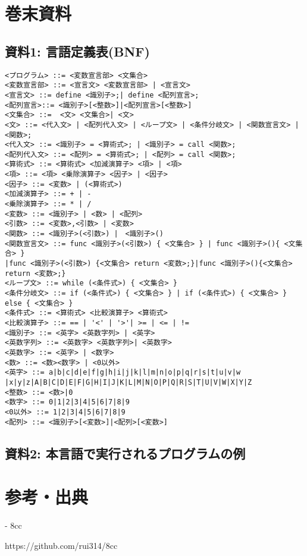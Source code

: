 \documentclass[11pt,a4j]{jarticle}
\begin{document}
\section{巻末資料}

\subsection{資料1: 言語定義表(BNF)}

{\baselineskip 2mm
\begin{verbatim}
<プログラム> ::= <変数宣言部> <文集合>
<変数宣言部> ::= <宣言文> <変数宣言部> | <宣言文>
<宣言文> ::= define <識別子>;| define <配列宣言>;
<配列宣言>::= <識別子>[<整数>]|<配列宣言>[<整数>]
<文集合> ::=  <文> <文集合>| <文>
<文> ::= <代入文> | <配列代入文> | <ループ文> | <条件分岐文> | <関数宣言文> | <関数>;
<代入文> ::= <識別子> = <算術式>; | <識別子> = call <関数>; 
<配列代入文> ::= <配列> = <算術式>; | <配列> = call <関数>;
<算術式> ::= <算術式> <加減演算子> <項> | <項>
<項> ::= <項> <乗除演算子> <因子> | <因子>
<因子> ::= <変数> | (<算術式>)
<加減演算子> ::= + | -
<乗除演算子> ::= * | /
<変数> ::= <識別子> | <数> | <配列>
<引数> ::= <変数>,<引数> | <変数>
<関数> ::= <識別子>(<引数>) |　<識別子>()
<関数宣言文> ::= func <識別子>(<引数>) { <文集合> } | func <識別子>(){ <文集合> }
|func <識別子>(<引数>) {<文集合> return <変数>;}|func <識別子>(){<文集合> return <変数>;}
<ループ文> ::= while (<条件式>) { <文集合> }
<条件分岐文> ::= if (<条件式>) { <文集合> } | if (<条件式>) { <文集合> } else { <文集合> }
<条件式> ::= <算術式> <比較演算子> <算術式>
<比較演算子> ::= == | '<' | '>'| >= | <= | !=
<識別子> ::= <英字> <英数字列> | <英字>
<英数字列> ::= <英数字> <英数字列>| <英数字>
<英数字> ::= <英字> | <数字>
<数> ::= <数><数字> | <0以外>
<英字> ::= a|b|c|d|e|f|g|h|i|j|k|l|m|n|o|p|q|r|s|t|u|v|w
|x|y|z|A|B|C|D|E|F|G|H|I|J|K|L|M|N|O|P|Q|R|S|T|U|V|W|X|Y|Z
<整数> ::= <数>|0
<数字> ::= 0|1|2|3|4|5|6|7|8|9
<0以外> ::= 1|2|3|4|5|6|7|8|9
<配列> ::= <識別子>[<変数>]|<配列>[<変数>]
\end{verbatim}}


\subsection{資料2: 本言語で実行されるプログラムの例}






\section{参考・出典}

- 8cc

https://github.com/rui314/8cc
\end{document}
